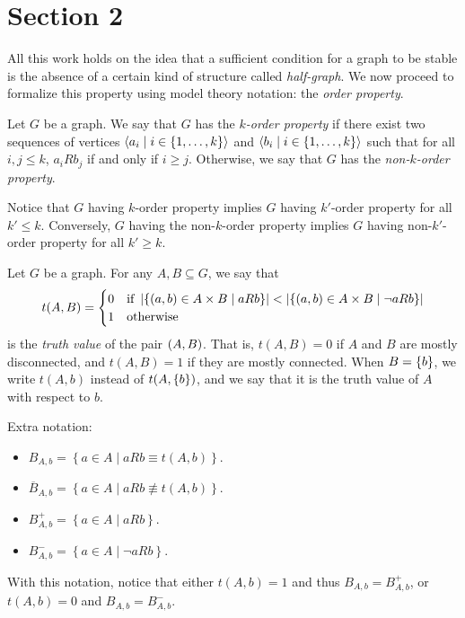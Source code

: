 \section{Section 2} \label{sec:section_2}

    All this work holds on the idea that a sufficient condition for a graph to be stable is the absence of
    a certain kind of structure called \emph{half-graph}.
    We now proceed to formalize this property using model theory notation: the \emph{order property}.

    \label{def:k_order_property}
        Let $G$ be a graph.
        We say that $G$ has the \emph{$k$-order property} if there exist two sequences of vertices
        $\left< a_i \mid i \in \left\{ 1, \dots, k \right\} \right>$ and $\left< b_i \mid i \in \left\{ 1, \dots, k \right\} \right>$ such that
        for all $i,j \leq k$, $a_i R b_j$ if and only if $i \geq j$.
        Otherwise, we say that $G$ has the \emph{non-$k$-order property}.

    \begin{remark}
        Notice that $G$ having $k$-order property implies $G$ having $k'$-order property for all $k' \leq k$.
        Conversely, $G$ having the non-$k$-order property implies $G$ having non-$k'$-order property for all $k' \geq k$.
    \end{remark}

    \label{def:truth_value}
        Let $G$ be a graph.
        For any $A, B \subseteq G$, we say that
        $$
            t(A,B) =
            \begin{cases}
                0 & \text{if } \left| \left\{ \left( a, b \right) \in A \times B \mid a R b \right\} \right| <
                    \left| \left\{ \left( a, b \right) \in A \times B \mid \neg a R b \right\} \right| \\
                1 & \text{otherwise}
            \end{cases}
        $$
        is the \emph{truth value} of the pair $\left( A,B \right)$.
        That is, $t(A,B) = 0$ if $A$ and $B$ are mostly disconnected, and $t(A,B) = 1$ if they are mostly connected.
        When $B = \left\{ b \right\}$, we write $t(A,b)$ instead of $t(A,\left\{ b \right\})$, and we say that it is the truth value of $A$
        with respect to $b$.
    \newline

    Extra notation:
    \begin{itemize}
        \item $B_{A,b} = \left\{ a \in A \mid a R b \equiv t(A,b) \right\}$.
        \item $\overline{B}_{A,b} = \left\{ a \in A \mid a R b \not\equiv t(A,b) \right\}$.
        \item $B^+_{A,b} = \left\{ a \in A \mid a R b \right\}$.
        \item $B^-_{A,b} = \left\{ a \in A \mid \neg a R b \right\}$.
    \end{itemize}
    With this notation, notice that either $t(A,b) = 1$ and thus $B_{A,b} = B^+_{A,b}$, or $t(A,b) = 0$ and $B_{A,b} = B^-_{A,b}$.

